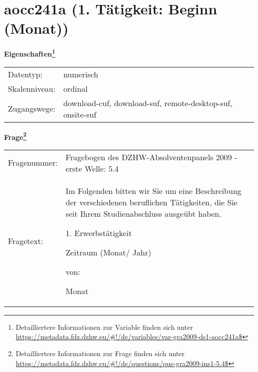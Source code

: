 
    \setcounter{footnote}{0}

    \vspace*{-1.8cm}
	\section{aocc241a (1. Tätigkeit: Beginn (Monat))}
	\label{section:aocc241a}



    \vspace*{0.5cm}
    \noindent\textbf{Eigenschaften\footnote{Detailliertere Informationen zur Variable finden sich unter
		\url{https://metadata.fdz.dzhw.eu/\#!/de/variables/var-gra2009-ds1-aocc241a$}}}\\
	\begin{tabularx}{\hsize}{@{}lX}
	Datentyp: & numerisch \\
	Skalenniveau: & ordinal \\
	Zugangswege: &
	  download-cuf, 
	  download-suf, 
	  remote-desktop-suf, 
	  onsite-suf
 \\
    \end{tabularx}



				\vspace*{0.5cm}
                \noindent\textbf{Frage\footnote{Detailliertere Informationen zur Frage finden sich unter
		              \url{https://metadata.fdz.dzhw.eu/\#!/de/questions/que-gra2009-ins1-5.4$}}}\\
				\begin{tabularx}{\hsize}{@{}lX}
					Fragenummer: &
					  Fragebogen des DZHW-Absolventenpanels 2009 - erste Welle:
					  5.4
 \\
					Fragetext: & Im Folgenden bitten wir Sie um eine Beschreibung der verschiedenen beruflichen Tätigkeiten, die Sie seit Ihrem Studienabschluss ausgeübt haben.\par  1. Erwerbstätigkeit\par  Zeitraum (Monat/ Jahr)\par  von:\par  Monat \\
				\end{tabularx}






